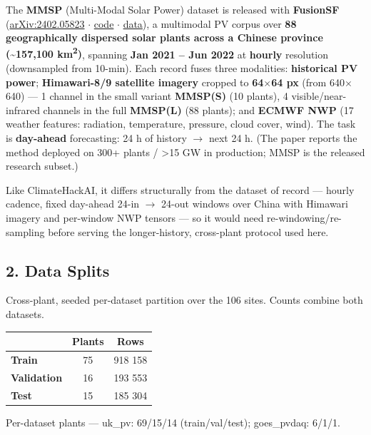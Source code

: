 \documentclass[
  9pt,
]{article}
\begin{document}
The \textbf{MMSP} (Multi-Modal Solar Power) dataset is released with
\textbf{FusionSF}
(\href{https://arxiv.org/abs/2402.05823}{arXiv:2402.05823} \(\cdot\)
\href{https://github.com/MAZiqing/FusionSF}{code} \(\cdot\)
\href{https://drive.google.com/drive/folders/1qGVOw-hAVQlO3n-1d4ZNHvL42L9PkdBK}{data}),
a multimodal PV corpus over \textbf{88 geographically dispersed solar
plants across a Chinese province (\textasciitilde157,100 km\textsuperscript{2})}, spanning
\textbf{Jan 2021 -- Jun 2022} at \textbf{hourly} resolution (downsampled
from 10-min). Each record fuses three modalities: \textbf{historical PV
power}; \textbf{Himawari-8/9 satellite imagery} cropped to \textbf{64\(\times\)64
px} (from 640\(\times\)640) --- 1 channel in the small variant \textbf{MMSP(S)}
(10 plants), 4 visible/near-infrared channels in the full
\textbf{MMSP(L)} (88 plants); and \textbf{ECMWF NWP} (17 weather
features: radiation, temperature, pressure, cloud cover, wind). The task
is \textbf{day-ahead} forecasting: 24 h of history \(\rightarrow\) next 24 h. (The
paper reports the method deployed on 300+ plants / \textgreater15 GW in
production; MMSP is the released research subset.)

Like ClimateHackAI, it differs structurally from the dataset of record
--- hourly cadence, fixed day-ahead 24-in \(\rightarrow\) 24-out windows over China
with Himawari imagery and per-window NWP tensors --- so it would need
re-windowing/re-sampling before serving the longer-history, cross-plant
protocol used here.

\newpage

\subsection{2. Data Splits}\label{data-splits}

Cross-plant, seeded per-dataset partition over the 106 sites. Counts
combine both datasets.

\begin{longtable}[]{@{}lcc@{}}
\toprule\noalign{}
& Plants & Rows \\
\midrule\noalign{}
\endhead
\bottomrule\noalign{}
\endlastfoot
\textbf{Train} & 75 & 918 158 \\
\textbf{Validation} & 16 & 193 553 \\
\textbf{Test} & 15 & 185 304 \\
\end{longtable}

Per-dataset plants --- uk\_\allowbreak{}pv: 69/15/14 (train/val/test); goes\_\allowbreak{}pvdaq:
6/1/1.
\end{document}
